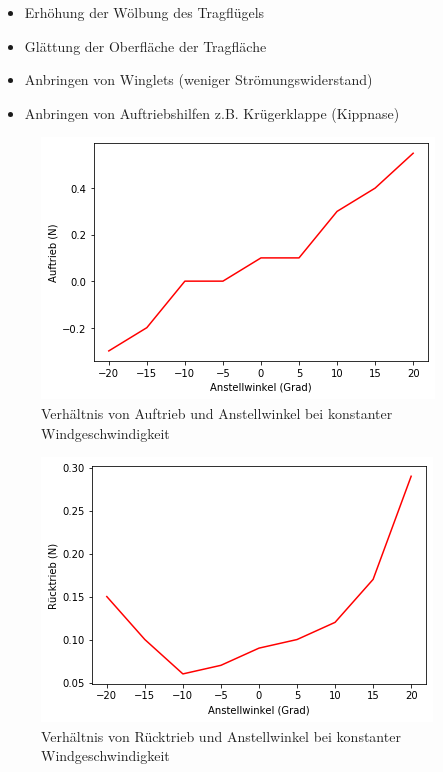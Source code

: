 \begin{itemize}
    \item Erhöhung der Wölbung des Tragflügels
    \item Glättung der Oberfläche der Tragfläche
    \item Anbringen von Winglets (weniger Strömungswiderstand)
    \item Anbringen von Auftriebshilfen z.B. Krügerklappe (Kippnase)
\end{itemize}

\begin{figure}
    \centering
    \includegraphics[scale=0.8]{Aeromechanik/Protokoll/fig/Aeromechanik Versuch 3.11.png}
    \caption{Verhältnis von Auftrieb und Anstellwinkel bei konstanter Windgeschwindigkeit}
    \label{fig:Aeoromechanik Versuch 3.11}
\end{figure}

\begin{figure}
    \centering
    \includegraphics[scale=0.8]{Aeromechanik/Protokoll/fig/Aeromechanik Versuch 3.12.png}
    \caption{Verhältnis von Rücktrieb und Anstellwinkel bei konstanter Windgeschwindigkeit}
    \label{fig:Aeromechanik Versuch 3.12}
\end{figure}


